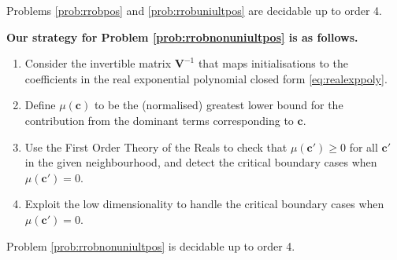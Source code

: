 \begin{theorem}
\label{thm:decide}
Problems \ref{prob:rrobpos} and \ref{prob:rrobuniultpos} are decidable up to order 4.
\end{theorem}

\textbf{Our strategy for Problem \ref{prob:rrobnonuniultpos} is as follows.}
\begin{enumerate}
\item Consider the invertible matrix $\mathbf{V}^{-1}$ that maps initialisations to the coefficients in the real exponential polynomial closed form \ref{eq:realexppoly}.
\item Define $\mu(\mathbf{c})$ to be the (normalised) greatest lower bound for the contribution from the dominant terms corresponding to $\mathbf{c}$.
\item Use the First Order Theory of the Reals to check that $\mu(\mathbf{c'}) \ge 0$ for all $\mathbf{c'}$ in the given neighbourhood, and detect the critical boundary cases when $\mu(\mathbf{c'}) = 0$.
\item Exploit the low dimensionality to handle the critical boundary cases when $\mu(\mathbf{c'}) = 0$.
\end{enumerate}

\begin{theorem}
\label{thm:decide2}
Problem \ref{prob:rrobnonuniultpos} is decidable up to order 4.
\end{theorem}




